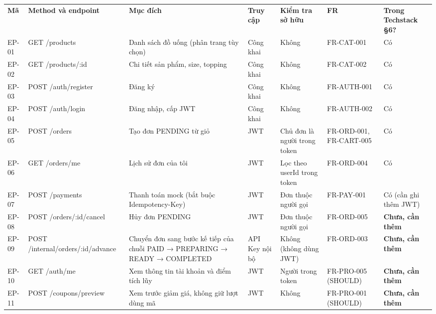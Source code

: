 \documentclass[11pt,a4paper,oneside]{report}
\begin{document}
\begin{longtable}[]{@{}
  >{\raggedright\arraybackslash}p{}
  >{\raggedright\arraybackslash}p{}
  >{\raggedright\arraybackslash}p{}
  >{\raggedright\arraybackslash}p{}
  >{\raggedright\arraybackslash}p{}
  >{\raggedright\arraybackslash}p{}
  >{\raggedright\arraybackslash}p{}@{}}
\toprule\noalign{}
\endhead
\bottomrule\noalign{}
\endlastfoot
\textbf{Mã} & \textbf{Method và endpoint} & \textbf{Mục đích} & \textbf{Truy cập} & \textbf{Kiểm tra sở hữu} & \textbf{FR} & \textbf{Trong Techstack §6?} \\
EP-01 & GET /products & Danh sách đồ uống (phân trang tùy chọn) & Công khai & Không & FR-CAT-001 & Có \\
EP-02 & GET /products/:id & Chi tiết sản phẩm, size, topping & Công khai & Không & FR-CAT-002 & Có \\
EP-03 & POST /auth/register & Đăng ký & Công khai & Không & FR-AUTH-001 & Có \\
EP-04 & POST /auth/login & Đăng nhập, cấp JWT & Công khai & Không & FR-AUTH-002 & Có \\
EP-05 & POST /orders & Tạo đơn PENDING từ giỏ & JWT & Chủ đơn là người trong token & FR-ORD-001, FR-CART-005 & Có \\
EP-06 & GET /orders/me & Lịch sử đơn của tôi & JWT & Lọc theo userId trong token & FR-ORD-004 & Có \\
EP-07 & POST /payments & Thanh toán mock (bắt buộc Idempotency-Key) & JWT & Đơn thuộc người gọi & FR-PAY-001 & Có (cần ghi thêm JWT) \\
EP-08 & POST /orders/:id/cancel & Hủy đơn PENDING & JWT & Đơn thuộc người gọi & FR-ORD-005 & \textbf{Chưa, cần thêm} \\
EP-09 & POST /internal/orders/:id/advance & Chuyển đơn sang bước kế tiếp của chuỗi PAID → PREPARING → READY → COMPLETED & API Key nội bộ & Không (không dùng JWT) & FR-ORD-003 & \textbf{Chưa, cần thêm} \\
EP-10 & GET /auth/me & Xem thông tin tài khoản và điểm tích lũy & JWT & Người trong token & FR-PRO-005 (SHOULD) & \textbf{Chưa, cần thêm} \\
EP-11 & POST /coupons/preview & Xem trước giảm giá, không giữ lượt dùng mã & JWT & Không & FR-PRO-001 (SHOULD) & \textbf{Chưa, cần thêm} \\
\end{longtable}
\end{document}
